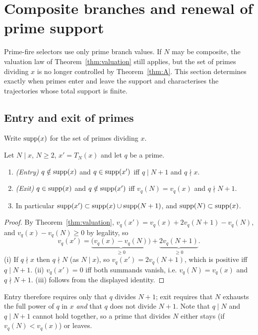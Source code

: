 \section{Composite branches and renewal of prime support}\label{sec:composite}
Prime-fire selectors use only prime branch values. If $N$ may be composite, the valuation law of Theorem~\ref{thm:valuation} still applies, but the set of primes dividing $x$ is no longer controlled by Theorem~\ref{thm:A}. This section determines exactly when primes enter and leave the support and characterises the trajectories whose total support is finite.

\subsection{Entry and exit of primes}
Write $\operatorname{supp}(x)$ for the set of primes dividing $x$.
\begin{lemma}[Renewal]\label{lem:renewal}
Let $N\mid x$, $N\ge2$, $x'=T_N(x)$ and let $q$ be a prime.
\begin{enumerate}[label=(\roman*),itemsep=1pt]
\item \emph{(Entry)} $q\notin\operatorname{supp}(x)$ and $q\in\operatorname{supp}(x')$ iff $q\mid N+1$ and $q\nmid x$.
\item \emph{(Exit)} $q\in\operatorname{supp}(x)$ and $q\notin\operatorname{supp}(x')$ iff $v_q(N)=v_q(x)$ and $q\nmid N+1$.
\item In particular $\operatorname{supp}(x')\subset\operatorname{supp}(x)\cup\operatorname{supp}(N+1)$, and $\operatorname{supp}(N)\subset\operatorname{supp}(x)$.
\end{enumerate}
\end{lemma}
\begin{proof}
By Theorem~\ref{thm:valuation}, $v_q(x')=v_q(x)+2v_q(N+1)-v_q(N)$, and $v_q(x)-v_q(N)\ge0$ by legality, so
\[
v_q(x')=\underbrace{\bigl(v_q(x)-v_q(N)\bigr)}_{\ge0}+\underbrace{2v_q(N+1)}_{\ge0}.
\]
(i) If $q\nmid x$ then $q\nmid N$ (as $N\mid x$), so $v_q(x')=2v_q(N+1)$, which is positive iff $q\mid N+1$. (ii) $v_q(x')=0$ iff both summands vanish, i.e. $v_q(N)=v_q(x)$ and $q\nmid N+1$. (iii) follows from the displayed identity. \end{proof}
Entry therefore requires only that $q$ divides $N+1$; exit requires that $N$ exhausts the full power of $q$ in $x$ \emph{and} that $q$ does not divide $N+1$. Note that $q\mid N$ and $q\mid N+1$ cannot hold together, so a prime that divides $N$ either stays (if $v_q(N)<v_q(x)$) or leaves.

